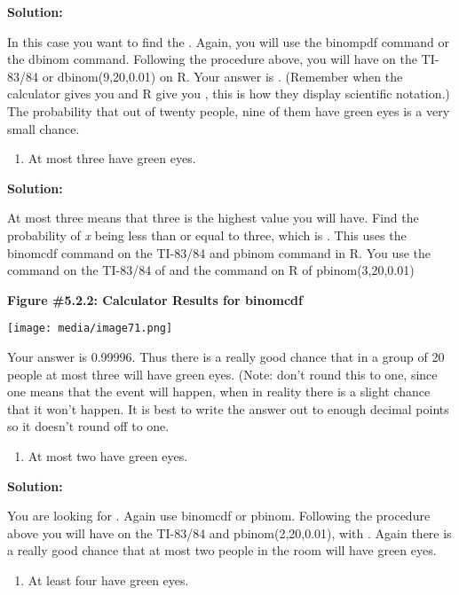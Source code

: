 \documentclass[]{book}
\providecommand{\tightlist}{%
  \setlength{\itemsep}{0pt}\setlength{\parskip}{0pt}}
\begin{document}
\textbf{Solution:}

In this case you want to find the . Again, you will use the binompdf
command or the dbinom command. Following the procedure above, you will
have on the TI-83/84 or dbinom(9,20,0.01) on R. Your answer is .
(Remember when the calculator gives you and R give you , this is how
they display scientific notation.) The probability that out of twenty
people, nine of them have green eyes is a very small chance.

\begin{enumerate}
\def\labelenumi{\alph{enumi}.}
\setcounter{enumi}{3}
\tightlist
\item
  At most three have green eyes.
\end{enumerate}

\textbf{Solution:}

At most three means that three is the highest value you will have. Find
the probability of \emph{x} being less than or equal to three, which is .
This uses the binomcdf command on the TI-83/84 and pbinom command in R.
You use the command on the TI-83/84 of and the command on R of
pbinom(3,20,0.01)

\textbf{Figure \#5.2.2: Calculator Results for binomcdf}

\texttt{[image: media/image71.png]}

Your answer is 0.99996. Thus there is a really good chance that in a
group of 20 people at most three will have green eyes. (Note: don't
round this to one, since one means that the event will happen, when in
reality there is a slight chance that it won't happen. It is best to
write the answer out to enough decimal points so it doesn't round off to
one.

\begin{enumerate}
\def\labelenumi{\alph{enumi}.}
\setcounter{enumi}{4}
\tightlist
\item
  At most two have green eyes.
\end{enumerate}

\textbf{Solution:}

You are looking for . Again use binomcdf or pbinom. Following the
procedure above you will have on the TI-83/84 and pbinom(2,20,0.01),
with . Again there is a really good chance that at most two people in
the room will have green eyes.

\begin{enumerate}
\def\labelenumi{\alph{enumi}.}
\setcounter{enumi}{5}
\tightlist
\item
  At least four have green eyes.
\end{enumerate}
\end{document}
